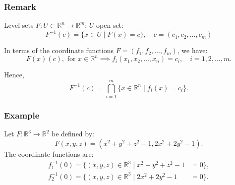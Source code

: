 \documentclass[11pt]{article}
\begin{document}
\subsubsection*{Remark}
Level sets $F : U \subset \mathbb{R}^n \to \mathbb{R}^m$; $U$ open set:
\[ F^{-1}(c) = \{ x \in U \mid F(x) = c \}, \quad c = (c_1, c_2, \ldots, c_m) \]

In terms of the coordinate functions $F = (f_1, f_2, \ldots, f_m)$, we have:
\[ F(x)(c), \text{ for } x \in \mathbb{R}^n \implies f_i(x_1, x_2, \ldots, x_n) = c_i, \quad i = 1, 2, \ldots, m. \]

Hence,
\[ F^{-1}(c) = \bigcap_{i=1}^m \{ x \in \mathbb{R}^n \mid f_i(x) = c_i \}. \]

\subsubsection*{Example}
Let $F : \mathbb{R}^3 \to \mathbb{R}^2$ be defined by:
\[ F(x, y, z) = (x^2 + y^2 + z^2 - 1, 2x^2 + 2y^2 - 1). \]
The coordinate functions are:
\begin{align*}
f^{-1}_1(0) = \{(x,y,z) \in \mathbb{R}^3 \mid x^2 + y^2 + z^2 - 1 & = 0\}, \\
f^{-1}_2(0) = \{(x,y,z) \in \mathbb{R}^3 \mid 2x^2 + 2y^2 - 1 & = 0\}.
\end{align*}
\end{document}
